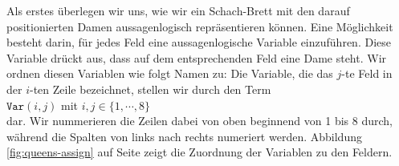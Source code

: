 Als erstes \"{u}berlegen wir uns, wie wir ein Schach-Brett mit den darauf
positionierten Damen aussagenlogisch repr\"{a}sentieren k\"{o}nnen.  Eine M\"{o}glichkeit besteht darin, 
f\"{u}r jedes Feld eine aussagenlogische Variable einzuf\"{u}hren.  Diese Variable dr\"{u}ckt
aus, dass auf dem entsprechenden Feld eine Dame steht.  Wir ordnen diesen Variablen wie
folgt Namen zu:  Die Variable, die das $j$-te Feld in der $i$-ten
Zeile bezeichnet, stellen wir durch den Term \\[0.2cm]
\hspace*{1.3cm} $\texttt{Var}(i,j)$ \quad mit $i,j \in \{1, \cdots, 8\}$ \\[0.2cm]
dar. Wir nummerieren die Zeilen dabei von oben beginnend von 1 bis 8 durch, w\"{a}hrend die
Spalten von links nach rechts numeriert werden.  Abbildung \ref{fig:queens-assign} auf
Seite \pageref{fig:queens-assign} zeigt die Zuordnung der Variablen zu den Feldern.

